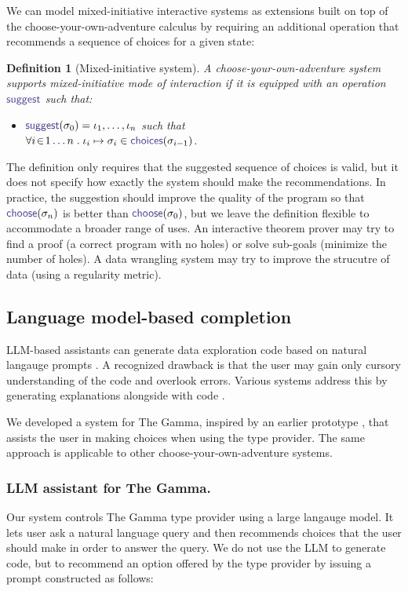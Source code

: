 \documentclass[nonacm,anonymous,sigplan,screen]{acmart}
\newcommand{\ident}[1]{\textsf{\color{DarkSlateBlue}{#1}}}
\newcommand{\select}{\textnormal{\ident{choose}}}
\newcommand{\suggest}{\textnormal{\ident{suggest}}}
\newcommand{\choices}{\textnormal{\ident{choices}}}
\newtheorem{definition}{Definition}
\begin{document}
We can model mixed-initiative interactive systems as extensions built on top of the
choose-your-own-adventure calculus by requiring an additional
operation \ident{suggest} that recommends a sequence of choices for a given state:

\begin{definition}[Mixed-initiative system]
A choose-your-own-adventure system supports mixed-initiative mode of interaction if it is
equipped with an operation $\suggest$ such that:
\begin{itemize}
  \item $\suggest(\sigma_0)=\iota_1, \ldots, \iota_n$ such that\\
    $\forall i\!\in\! 1\ldots n\;.\;\iota_i\mapsto\sigma_i\in\choices(\sigma_{i-1})$.
\end{itemize}
\end{definition}

The definition only requires that the suggested sequence of choices is valid, but it
does not specify how exactly the system should make the recommendations.
In practice, the suggestion should improve the quality of the program so that
$\select(\sigma_n)$ is better than $\select(\sigma_0)$, but we leave the definition flexible
to accommodate a broader range of uses. An interactive theorem prover may try to find a proof
(a correct program with no holes) or solve sub-goals (minimize the number of holes).
A data wrangling system may try to improve the strucutre of data (using a regularity metric).

\subsection{Language model-based completion}
LLM-based assistants can generate data exploration code based on natural langauge prompts
\cite{yin-2023-codegen}. A recognized drawback is that the user may gain
only cursory understanding of the code and overlook errors. Various systems address this by
generating explanations alongside with code \cite{nooralahzadeh-2024-data}.

We developed a system for The Gamma, inspired by an earlier prototype \cite{fromm-2024-llm},
that assists the user in making choices when using the type provider. The same approach is
applicable to other choose-your-own-adventure systems.

\subsubsection*{LLM assistant for The Gamma.}
Our system controls The Gamma type provider using a large langauge model. It lets user ask a
natural language query and then recommends choices that the user
should make in order to answer the query. We do not use the LLM to generate code, but to recommend
an option offered by the type provider by issuing a prompt constructed as follows:
\end{document}

